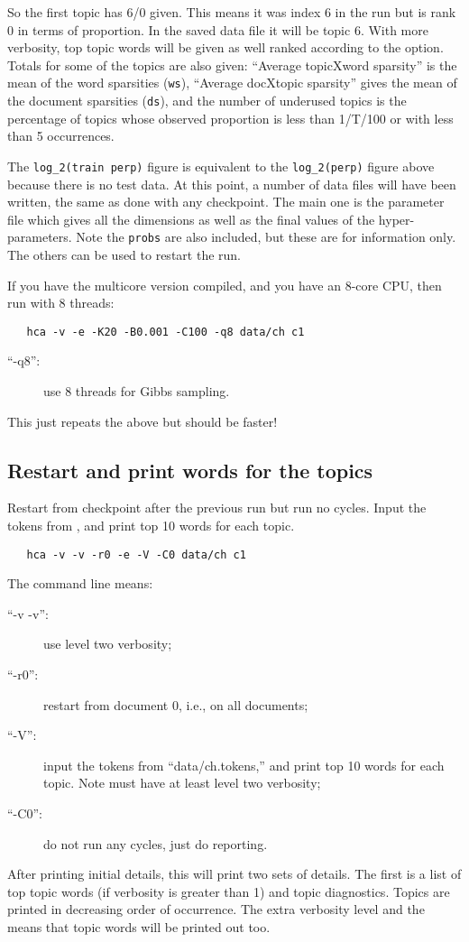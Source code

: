 \documentclass[a4paper,english]{article}
\begin{document}
So the first topic has 6/0 given.  This means it was index 6 in the
run but is rank 0 in terms of proportion.  In the saved data file
it will be topic 6.  With more verbosity, top topic words will be given
as well ranked according to the  option.
Totals for some of the topics are also given:
``Average topicXword sparsity'' is the mean of the word sparsities
(\texttt{ws}),  ``Average docXtopic sparsity''
gives the mean of the document sparsities (\texttt{ds}),
and the number of underused topics is the
percentage of topics whose observed proportion
is less than 1/T/100 or with less than 5 occurrences.

The \texttt{log\_2(train perp)} figure is equivalent
to the \texttt{log\_2(perp)} figure 
above because there is no test data.
At this point, a number of data files will have been
written, the same as done with any checkpoint.
The main one is the parameter file
 which gives all the dimensions as well
as the final values of the hyper-parameters.
Note the \texttt{probs} are also included, but these
are for information only.
The others can be used to restart the run.

If you have the multicore version compiled, 
and you have an 8-core CPU, then run with 8 threads:
\begin{verbatim}
   hca -v -e -K20 -B0.001 -C100 -q8 data/ch c1
\end{verbatim}
\begin{description}
\item[``-q8'':] use 8 threads for Gibbs sampling.
\end{description}
This just repeats the above but should be faster!

\subsection{Restart and print words for the topics}
Restart from checkpoint after the previous run but run no cycles.
Input the tokens from
, and print top 10 words for each topic.
\begin{verbatim}
   hca -v -v -r0 -e -V -C0 data/ch c1
\end{verbatim}
The command line means:
\begin{description}
\item[``-v -v'':] use level two verbosity;
\item[``-r0'':] restart from document 0, i.e., on all documents;
\item[``-V'':] input the tokens from
``data/ch.tokens,'' and print top 10 words for each topic.
Note must have at least level two verbosity;
\item[``-C0'':] do not run any cycles, just do reporting.
\end{description}
After printing initial details, this will print two
sets of details.
The first is a list of top topic words (if verbosity is greater than 1)
and topic diagnostics. 
Topics are printed in decreasing order of occurrence.
The extra verbosity level and the 
means that topic words will be printed out too.
\end{document}
